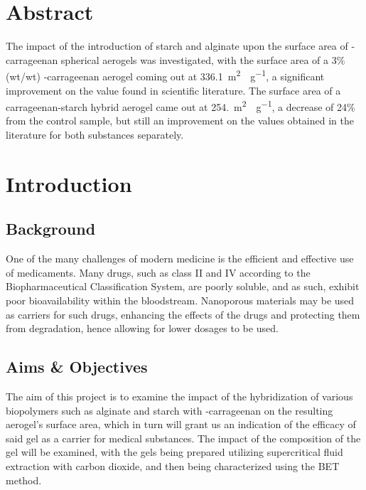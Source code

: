 \documentclass[a4paper,12pt]{article}
\begin{document}
\vfill

\newpage
  

\section{Abstract}

The impact of the introduction of starch and alginate upon the surface area of \textkappa-carrageenan spherical aerogels was investigated, with the surface area of a 3\% (wt/wt) \textkappa-carrageenan aerogel coming out at \SI{336.1}{m^2\cdot g^{-1}}, a significant improvement on the value found in scientific literature. The surface area of a carrageenan-starch hybrid aerogel came out at \SI{254.}{{m^2\cdot g^{-1}}}, a decrease of 24\% from the control sample, but still an improvement on the values obtained in the literature for both substances separately.
 
\pagebreak

\section{Introduction}

\subsection{Background}

One of the many challenges of modern medicine is the efficient and effective use of medicaments. Many drugs, such as class II and IV according to the Biopharmaceutical Classification System, are poorly soluble, and as such, exhibit poor bioavailability within the bloodstream. Nanoporous materials may be used as carriers for such drugs, enhancing the effects of the drugs and protecting them from degradation, hence allowing for lower dosages to be used.\supercite{ulker_emerging_2014}

\subsection{Aims \& Objectives}

The aim of this project is to examine the impact of the hybridization of various biopolymers such as alginate and starch with \textkappa-carrageenan on the resulting aerogel's surface area, which in turn will grant us an indication of the efficacy of said gel as a carrier for medical substances. The impact of the composition of the gel will be examined, with the gels being prepared utilizing supercritical fluid extraction with carbon dioxide, and then being characterized using the BET method.
\end{document}
